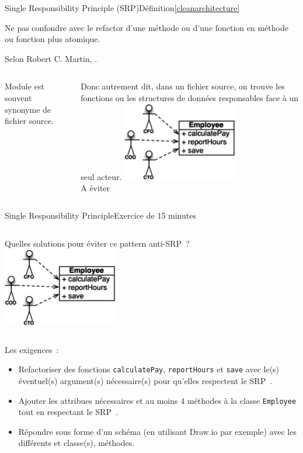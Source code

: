 \documentclass{beamer}
\begin{document}
    \begin{frame}{Single Responsibility Principle (SRP)}{Définition\cref{cleanarchitecture}}
        \begin{dangercolorbox}
            Ne pas confondre avec le refactor d'une méthode ou d'une fonction en méthode ou fonction plus atomique.
        \end{dangercolorbox}
        Selon Robert C. Martin, .
        \begin{columns}
            Module est souvent synonyme de fichier source.

            Donc autrement dit, dans un fichier source, on trouve les fonctions ou les structures de données responsables face à un seul acteur.
            \centering
            \includegraphics[width=5cm]{image/s-to-avoid} \\ A éviter \\
        \end{columns}
    \end{frame}

    \begin{frame}{Single Responsibility Principle}{Exercice \execcounterdispinc{} de 15 minutes}
        \begin{columns}
            Quelles solutions pour éviter ce pattern anti-SRP~?
            \bigbreak
            \centering
            \includegraphics[width=5cm]{image/s-to-avoid}
        \end{columns}
        \flushleft
        Les exigences~:
        \begin{itemize}
            \item Refactoriser des fonctions \lstinline{calculatePay}, \lstinline{reportHours} et \lstinline{save} avec le(s) éventuel(s) argument(s) nécessaire(s) pour qu'elles respectent le SRP~.
            \item Ajouter les attribues nécessaires et au moins 4 méthodes à la classe \lstinline{Employee} tout en respectant le SRP~.
            \item Répondre sous forme d'un schéma (en utilisant Draw.io par exemple) avec les différents et classe(s), méthodes.
        \end{itemize}
    \end{frame}
\end{document}
